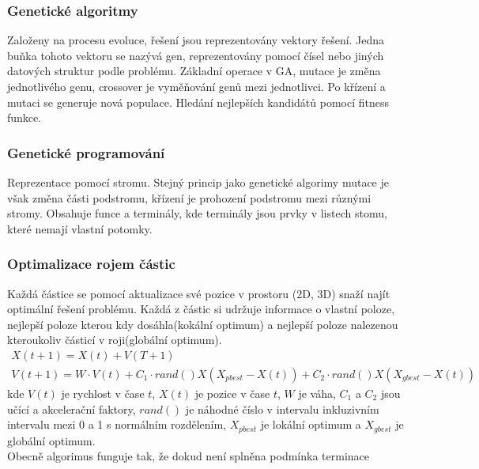\subsubsection{Genetické algoritmy}
Založeny na procesu evoluce, řešení jsou reprezentovány vektory řešení. Jedna buňka tohoto vektoru se nazývá gen, reprezentovány pomocí čísel nebo jiných datových
struktur podle problému. Základní operace v GA, mutace je změna jednotlivého genu, crossover je vyměňování genů mezi jednotlivci. Po křízení a mutaci se generuje
nová populace. Hledání nejlepších kandidátů pomocí fitness funkce.

\subsubsection{Genetické programování}
Reprezentace pomocí stromu. Stejný princip jako genetické algorimy mutace je však změna části podstromu, křízení je prohození podstromu mezi různými stromy. 
Obsahuje funce a terminály, kde terminály jsou prvky v listech stomu, které nemají vlastní potomky. 

\subsubsection{Optimalizace rojem částic}
Každá částice se pomocí aktualizace své pozice v prostoru (2D, 3D) snaží najít optimální řešení problému. Každá z částic si udržuje informace o vlastní poloze, nejlepší poloze
kterou kdy dosáhla(kokální optimum) a nejlepší poloze nalezenou kteroukoliv částicí v roji(globální optimum). 
\begin{gather*}
    X(t+1) = X(t) + V(T+1)\\
    V(t+1) = W\cdot V(t) + C_1\cdot rand()X(X_{pbest}-X(t)) + C_2\cdot rand()X(X_{gbest}-X(t))
\end{gather*}
kde \(V(t)\) je rychlost v čase \(t\), \(X(t)\) je pozice v čase \(t\), \(W\) je váha, \(C_1\) a \(C_2\) jsou učící a akcelerační faktory, \(rand()\) je náhodné
číslo v intervalu inkluzivním intervalu mezi 0 a 1 s normálním rozdělením, \(X_ {pbest}\) je lokální optimum a \(X_{gbest}\) je globální optimum. \\
Obecně algorimus funguje tak, že dokud není splněna podmínka terminace 

